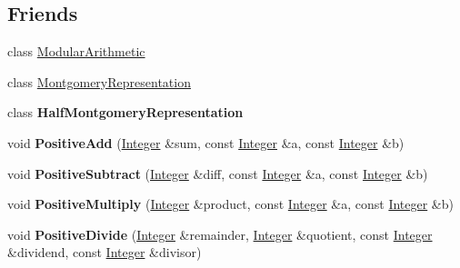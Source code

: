 \subsection*{Friends}
\begin{DoxyCompactItemize}
\item 
\hypertarget{class_integer_a0ef821fc78e4bfe3236b3a0157df189d}{
class \hyperlink{class_integer_a0ef821fc78e4bfe3236b3a0157df189d}{ModularArithmetic}}
\label{class_integer_a0ef821fc78e4bfe3236b3a0157df189d}

\item 
\hypertarget{class_integer_a14e60a19be28337cb24783301e091877}{
class \hyperlink{class_integer_a14e60a19be28337cb24783301e091877}{MontgomeryRepresentation}}
\label{class_integer_a14e60a19be28337cb24783301e091877}

\item 
\hypertarget{class_integer_aef0adde4261276d74ddf19366c427b62}{
class {\bfseries HalfMontgomeryRepresentation}}
\label{class_integer_aef0adde4261276d74ddf19366c427b62}

\item 
\hypertarget{class_integer_a6295e7fe9ae3d0c22e38168e8fd7c0f1}{
void {\bfseries PositiveAdd} (\hyperlink{class_integer}{Integer} \&sum, const \hyperlink{class_integer}{Integer} \&a, const \hyperlink{class_integer}{Integer} \&b)}
\label{class_integer_a6295e7fe9ae3d0c22e38168e8fd7c0f1}

\item 
\hypertarget{class_integer_acc5b1ed43bfa0c217e2c64535515e7bb}{
void {\bfseries PositiveSubtract} (\hyperlink{class_integer}{Integer} \&diff, const \hyperlink{class_integer}{Integer} \&a, const \hyperlink{class_integer}{Integer} \&b)}
\label{class_integer_acc5b1ed43bfa0c217e2c64535515e7bb}

\item 
\hypertarget{class_integer_a53b5444044b02d93e76fafac50c3bb29}{
void {\bfseries PositiveMultiply} (\hyperlink{class_integer}{Integer} \&product, const \hyperlink{class_integer}{Integer} \&a, const \hyperlink{class_integer}{Integer} \&b)}
\label{class_integer_a53b5444044b02d93e76fafac50c3bb29}

\item 
\hypertarget{class_integer_a30542b29292dbe332eb60b6aabfaf937}{
void {\bfseries PositiveDivide} (\hyperlink{class_integer}{Integer} \&remainder, \hyperlink{class_integer}{Integer} \&quotient, const \hyperlink{class_integer}{Integer} \&dividend, const \hyperlink{class_integer}{Integer} \&divisor)}
\label{class_integer_a30542b29292dbe332eb60b6aabfaf937}

\end{DoxyCompactItemize}
